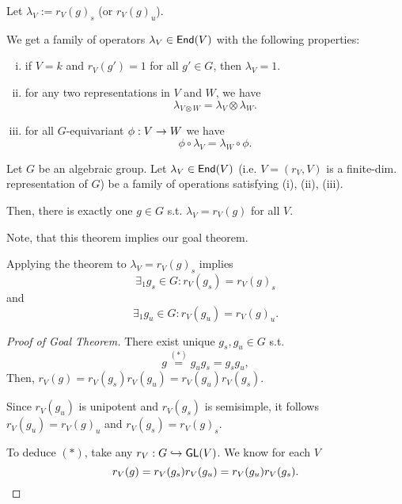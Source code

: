 Let $\lambda_V := r_V(g)_s$ (or $r_V(g)_u$).

We get a family of operators $\lambda_V \in \textsf{End}(V)$ with the following properties:
\begin{enumerate}[(i)]
	\item if $V = k$ and $r_V(g') = 1$ for all $g' \in G$, then $\lambda_V = 1$.
	\item for any two representations in $V$ and $W$, we have
	\[\lambda_{V\otimes W} = \lambda_V \otimes \lambda_W.\]
	\item for all $G$-equivariant $\phi : V \overset{}{\rightarrow} W$ we have
	\[ \phi \circ \lambda_V = \lambda_W \circ  \phi. \]
\end{enumerate}

\begin{theorem}
Let $G$ be an algebraic group. Let $\lambda_V \in \textsf{End}(V)$ (i.e. $V = (r_V, V)$ is a finite-dim. representation of $G$) be a family of operations satisfying (i), (ii), (iii).

Then, there is exactly one $g \in G$ s.t. $\lambda_V = r_V(g)$ for all $V$.
\end{theorem}
Note, that this theorem implies our goal theorem.

Applying the theorem to $\lambda_V = r_V(g)_s$ implies
\[ \exists_1 g_s \in G: r_V(g_s) = r_V(g)_s \]
and
\[ \exists_1 g_u \in G: r_V(g_u) = r_V(g)_u. \]

\begin{proof}[Proof of Goal Theorem]
There exist unique $g_s, g_u \in G$ s.t.
\[ g \overset{(*)}{=} g_u g_s = g_s g_u, \]
Then, $r_V(g) = r_V(g_s) r_V(g_u) = r_V(g_u) r_V(g_s)$.

Since $r_V(g_u)$ is unipotent and $r_V(g_s)$ is semisimple, it follows $r_V(g_u) = r_V(g)_u$ and $r_V(g_s) = r_V(g)_s$.

To deduce $(*)$, take any $r_V:G \overset{}{\hookrightarrow} \textsf{GL}(V)$. We know for each $V$
\[ r_V(g) = r_V(g_s) r_V(g_u) = r_V(g_u)r_V(g_s).\qedhere \]
\end{proof}

